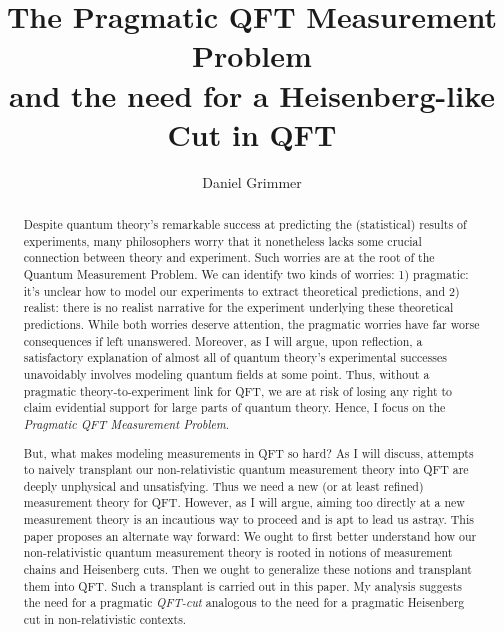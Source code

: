 \documentclass[prd,twocolumn,superscriptaddress,floatfix,amsmath,amssymb,amsfonts,nofootinbib]{revtex4-2}
\begin{document}
\title{The Pragmatic QFT Measurement Problem\\ and the need for a Heisenberg-like Cut in QFT}

\author{Daniel Grimmer}

\begin{abstract}
Despite quantum theory's remarkable success at predicting the (statistical) results of experiments, many philosophers worry that it nonetheless lacks some crucial connection between theory and experiment. Such worries are at the root of the Quantum Measurement Problem. We can identify two kinds of worries: 1) pragmatic: it's unclear how to model our experiments to extract theoretical predictions, and 2) realist: there is no realist narrative for the experiment underlying these theoretical predictions. While both worries deserve attention, the pragmatic worries have far worse consequences if left unanswered. Moreover, as I will argue, upon reflection, a satisfactory explanation of almost all of quantum theory's experimental successes unavoidably involves modeling quantum fields at some point. Thus, without a pragmatic theory-to-experiment link for QFT, we are at risk of losing any right to claim evidential support for large parts of quantum theory. Hence, I focus on the \textit{Pragmatic QFT Measurement Problem}.

But, what makes modeling measurements in QFT so hard? As I will discuss, attempts to naively transplant our non-relativistic quantum measurement theory into QFT are deeply unphysical and unsatisfying. Thus we need a new (or at least refined) measurement theory for QFT. However, as I will argue, aiming too directly at a new measurement theory is an incautious way to proceed and is apt to lead us astray. This paper proposes an alternate way forward: We ought to first better understand how our non-relativistic quantum measurement theory is rooted in notions of measurement chains and Heisenberg cuts. Then we ought to generalize these notions and transplant them into QFT. Such a transplant is carried out in this paper. My analysis suggests the need for a pragmatic \textit{QFT-cut} analogous to the need for a pragmatic Heisenberg cut in non-relativistic contexts.
\end{abstract}
\end{document}
